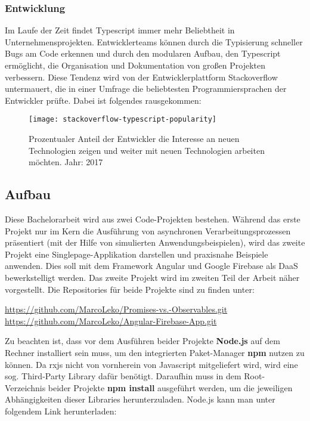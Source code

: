 \subsubsection{Entwicklung}
Im Laufe der Zeit findet Typescript immer mehr Beliebtheit in Unternehmensprojekten. Entwicklerteams können durch die Typisierung schneller Bugs am Code erkennen und durch den modularen Aufbau, den Typescript ermöglicht, die Organisation und Dokumentation von großen Projekten verbessern. Diese Tendenz wird von der Entwicklerplattform Stackoverflow untermauert, die in einer Umfrage die beliebtesten Programmiersprachen der Entwickler prüfte.
Dabei ist folgendes rausgekommen:

\begin{figure}[H]
\centering
\texttt{[image: stackoverflow-typescript-popularity]}
\caption{Prozentualer Anteil der Entwickler die Interesse an neuen Technologien zeigen und weiter mit neuen Technologien arbeiten möchten. Jahr: 2017 \cite{typescript-survey}}
\end{figure}

\subsection{Aufbau}
Diese Bachelorarbeit wird aus zwei Code-Projekten bestehen. Während das erste Projekt nur im Kern die Ausführung von asynchronen Verarbeitungsprozessen präsentiert (mit der Hilfe von simulierten Anwendungsbeispielen), wird das zweite Projekt eine Singlepage-Applikation darstellen und praxisnahe Beispiele anwenden. Dies soll mit dem Framework Angular und Google Firebase als DaaS bewerkstelligt werden. Das zweite Projekt wird im zweiten Teil der Arbeit näher vorgestellt. Die Repositories für beide Projekte sind zu finden unter: 

\begin{center}
\url{https://github.com/MarcoLeko/Promises-vs.-Observables.git} \\
\url{https://github.com/MarcoLeko/Angular-Firebase-App.git}
\end{center}

\noindent
Zu beachten ist, dass vor dem Ausführen beider Projekte \textbf{Node.js} auf dem Rechner installiert sein muss, um den integrierten Paket-Manager \textbf{npm} nutzen zu können. Da rxjs nicht von vornherein von Javascript mitgeliefert wird, wird eine sog. \glqq  Third-Party Library\grqq{} dafür benötigt. Daraufhin muss in dem Root-Verzeichnis beider Projekte \textbf{npm install} ausgeführt werden, um die jeweiligen Abhängigkeiten dieser Libraries herunterzuladen. Node.js kann man unter folgendem Link herunterladen:

